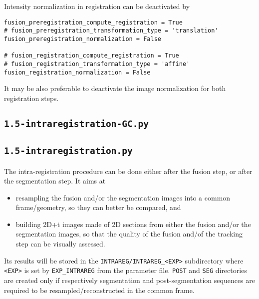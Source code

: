 Intensity normalization in registration can be deactivated by
\begin{verbatim}
fusion_preregistration_compute_registration = True
# fusion_preregistration_transformation_type = 'translation'
fusion_preregistration_normalization = False

# fusion_registration_compute_registration = True
# fusion_registration_transformation_type = 'affine'
fusion_registration_normalization = False
\end{verbatim}
It may be also preferable to  deactivate the image normalization for both registration steps.

%
%
%


\subsection{\texttt{1.5-intraregistration-GC.py}}

\subsection{\texttt{1.5-intraregistration.py}}

The intra-registration procedure can be done either after the fusion step, or after the segmentation step. It aims at
\begin{itemize}
\item resampling the fusion and/or the segmentation images into a common frame/geometry, so they can better be compared, and
\item building 2D+t images made of 2D sections from either the  fusion and/or the segmentation images, so that the quality of the fusion and/of the tracking step can be visually assessed.
\end{itemize}
Its results will be stored in the \verb|INTRAREG/INTRAREG_<EXP>| subdirectory where \verb|<EXP>| is set by \verb|EXP_INTRAREG| from the parameter file. \verb|POST| and \verb|SEG| directories are created only if respectively segmentation and post-segmentation sequences are required to be resampled/reconstructed in the common frame.


